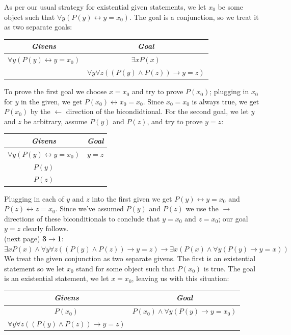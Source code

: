 \documentclass{report}
\theoremstyle{definition}
\begin{document}
As per our usual strategy for existential given statements, we let $x_0$ be some object such that $\forall y(P(y)\leftrightarrow y=x_0)$. The goal is a conjunction, so we treat it as two
separate goals:
\begin{center}
\begin{tabular}{c|c}
\textit{Givens}&\textit{Goal}\\
\hline
$\forall y(P(y)\leftrightarrow y=x_0)$&$\exists xP(x)$\\
&$\forall y\forall z((P(y)\land P(z))\to y=z)$
\end{tabular}
\end{center}
To prove the first goal we choose $x=x_0$ and try to prove $P(x_0)$; plugging in $x_0$ for $y$ in the given, we get $P(x_0)\leftrightarrow x_0=x_0$. Since $x_0=x_0$ is always true, we get $P(x_0)$
by the $\leftarrow$ direction of the bicondidtional.
For the second goal, we let $y$ and $z$ be arbitrary, assume $P(y)$ and $P(z)$, and try to prove $y=z$:
\begin{center}
\begin{tabular}{c|c}
\textit{Givens}&\textit{Goal}\\
\hline
$\forall y(P(y)\leftrightarrow y=x_0)$&$y=z$\\
$P(y)$&\\
$P(z)$&
\end{tabular}
\end{center}
Plugging in each of $y$ and $z$ into the first given we get $P(y)\leftrightarrow y=x_0$ and 
$P(z)\leftrightarrow z=x_0$. Since we've assumed $P(y)$ and $P(z)$ we use the $\rightarrow$
directions of these biconditionals to conclude that $y=x_0$ and $z=x_0$; our goal $y=z$ clearly follows.\\
(next page)\newpage
\noindent\textbf{3$\to$1}:$\exists xP(x)\land\forall y\forall z((P(y)\land P(z))\to y=z)\to\exists x(P(x)\land\forall y(P(y)\to y=x))$\\
We treat the given conjunction as two separate givens. The first is an existential statement so we let $x_0$ stand for some object such that $P(x_0)$ is true. The goal is an existential statement, 
we let $x=x_0$, leaving us with this situation:
\begin{center}
\begin{tabular}{c|c}
\textit{Givens}&\textit{Goal}\\
\hline
$P(x_0)$&$P(x_0)\land\forall y(P(y)\to y=x_0)$\\
$\forall y\forall z((P(y)\land P(z))\to y=z)$&
\end{tabular}
\end{center}
\end{document}
